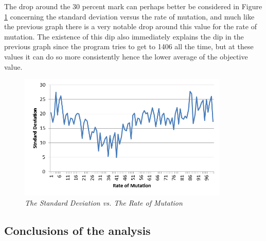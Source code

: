 The drop around the 30 percent mark can perhaps better be considered in Figure \ref{SDRM} concerning the standard deviation versus the rate of mutation, and much like the previous graph there is a very notable drop around this value for the rate of mutation. The existence of this dip also immediately explains the dip in the previous graph since the program tries to get to 1406 all the time, but at these values it can do so more consistently hence the lower average of the objective value.
\par

\begin{figure}[H] 
	\centering
	\includegraphics[height=6cm]{SDRM}
	\caption{\textsl{The Standard Deviation vs. The Rate of Mutation}}
	\label{SDRM}
\end{figure}

\subsection{Conclusions of the analysis}


